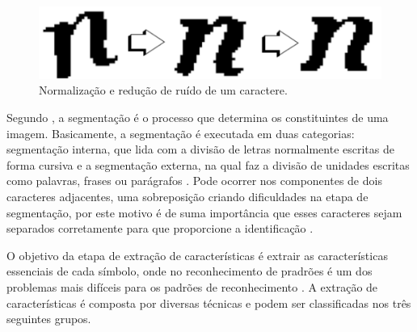  \begin{figure}[h]
	\centering
	\includegraphics[width=1.0\textwidth]{Imagens/norm_suav_caracter} 
	\caption[Normalização e redução de ruído de um caractere.]{Normalização e redução de ruído de um caractere.}
	\label{fig:tux_laplace}
\end{figure}

Segundo , a segmentação é o processo que determina os constituintes de uma imagem. Basicamente, a segmentação é executada em duas categorias: segmentação interna, que lida com a divisão de letras normalmente escritas de forma cursiva e a segmentação externa, na qual faz a divisão de unidades escritas como palavras, frases ou parágrafos \cite{Goswami2013}. Pode ocorrer nos componentes de dois caracteres adjacentes, uma sobreposição criando dificuldades na etapa de segmentação, por este motivo é de suma importância que esses caracteres sejam separados corretamente para que proporcione a identificação \cite{Bhatia2014}.

O objetivo da etapa de extração de características é extrair as características
essenciais de cada símbolo, onde no reconhecimento de pradrões é um dos problemas mais difíceis para os padrões de reconhecimento \cite{Eikvil1993}. A extração de características é composta por diversas técnicas e podem ser classificadas nos três seguintes grupos.

